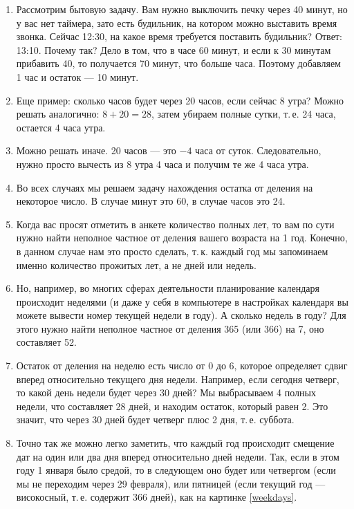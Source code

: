 \begin{enumerate}
\item Рассмотрим бытовую задачу. Вам нужно выключить печку через 40 минут, но у вас нет таймера, зато есть будильник, на котором можно выставить время звонка. Сейчас 12:30, на какое время требуется поставить будильник? Ответ: 13:10. Почему так? Дело в том, что в часе 60 минут, и если к 30 минутам прибавить 40, то получается 70 минут, что больше часа. Поэтому добавляем 1 час и остаток --- 10 минут.
\item Еще пример: сколько часов будет через 20 часов, если сейчас 8 утра? Можно решать аналогично: $8+20=28$, затем убираем полные сутки, т.\,е. 24 часа, остается 4 часа утра.
\item Можно решать иначе. 20 часов --- это $-4$ часа от суток. Следовательно, нужно просто вычесть из 8 утра 4 часа и получим те же 4 часа утра.
\item Во всех случаях мы решаем задачу нахождения остатка от деления на некоторое число. В случае минут это 60, в случае часов это 24.
\item Когда вас просят отметить в анкете количество полных лет, то вам по сути нужно найти неполное частное от деления вашего возраста на 1 год. Конечно, в данном случае нам это просто сделать, т.\,к. каждый год мы запоминаем именно количество прожитых лет, а не дней или недель.
\item Но, например, во многих сферах деятельности планирование календаря происходит неделями (и даже у себя в компьютере в настройках календаря вы можете вывести номер текущей недели в году). А сколько недель в году? Для этого нужно найти неполное частное от деления 365 (или 366) на 7, оно составляет 52.
\item Остаток от деления на неделю есть число от 0 до 6, которое определяет сдвиг вперед относительно текущего дня недели. Например, если сегодня четверг, то какой день недели будет через 30 дней? Мы выбрасываем 4 полных недели, что составляет 28 дней, и находим остаток, который равен 2. Это значит, что через 30 дней будет четверг плюс 2 дня, т.\,е. суббота.
\item Точно так же можно легко заметить, что каждый год происходит смещение дат на один или два дня вперед относительно дней недели. Так, если в этом году 1 января было средой, то в следующем оно будет или четвергом (если мы не переходим через 29 февраля), или пятницей (если текущий год --- високосный, т.\,е. содержит 366 дней), как на картинке \ref{weekdays}.
\begin{figure}[hbt!]

\end{figure}
\end{enumerate}

